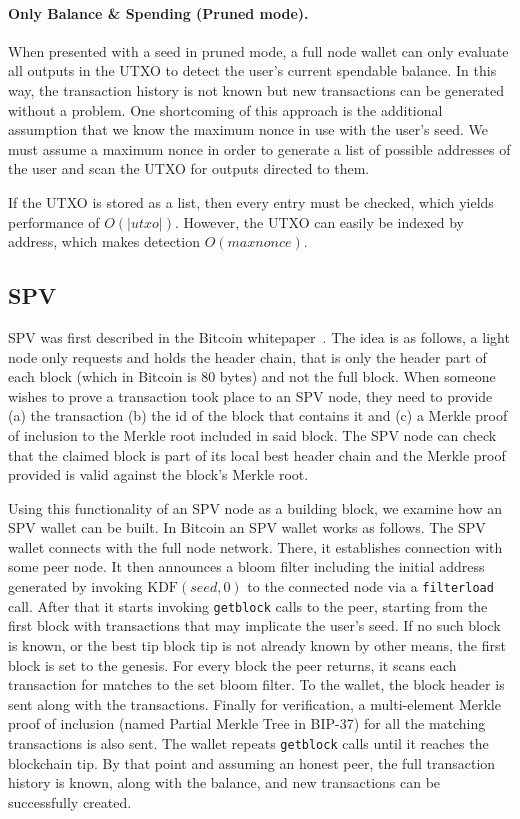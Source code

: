 \documentclass[sigconf]{acmart}
\begin{document}
\paragraph{Only Balance \& Spending (Pruned mode).}
When presented with a seed in pruned mode, a full node wallet can only evaluate all outputs in the UTXO to detect the user's current spendable balance. In this way, the transaction history is not known but new transactions can be generated without a problem. One shortcoming of this approach is the additional assumption that we know the maximum nonce in use with the user's seed. We must assume a maximum nonce in order to generate a list of possible addresses of the user and scan the UTXO for outputs directed to them.

If the UTXO is stored as a list, then every entry must be checked, which yields performance of $O(|utxo|)$. However, the UTXO can easily be indexed by address, which makes detection $O(maxnonce)$.
\subsection{SPV}
SPV was first described in the Bitcoin whitepaper~\cite{bitcoin}.
The idea is as follows, a light node only requests and holds the header chain, that is only the header part of each block (which in Bitcoin is 80 bytes) and not the full block. When someone wishes to prove a transaction took place to an SPV node, they need to provide (a) the transaction (b) the id of the block that contains it and (c) a Merkle proof of inclusion to the Merkle root included in said block. The SPV node can check that the claimed block is part of its local best header chain and the Merkle proof provided is valid against the block's Merkle root.

Using this functionality of an SPV node as a building block, we examine how an SPV wallet can be built. In Bitcoin an SPV wallet works as follows. The SPV wallet connects with the full node network. There, it establishes connection with some peer node. It then announces a bloom filter including the initial address generated by invoking $\text{KDF}(seed, 0)$ to the connected node via a \texttt{filterload} call. After that it starts invoking \texttt{getblock} calls to the peer, starting from the first block with transactions that may implicate the user's seed. If no such block is known, or the best tip block tip is not already known by other means, the first block is set to the genesis. For every block the peer returns, it scans each transaction for matches to the set bloom filter. To the wallet, the block header is sent along with the transactions. Finally for verification, a multi-element Merkle proof of inclusion (named Partial Merkle Tree in BIP-37) for all the matching transactions is also sent. The wallet repeats \texttt{getblock} calls until it reaches the blockchain tip. By that point and assuming an honest peer, the full transaction history is known, along with the balance, and new transactions can be successfully created.
\end{document}
